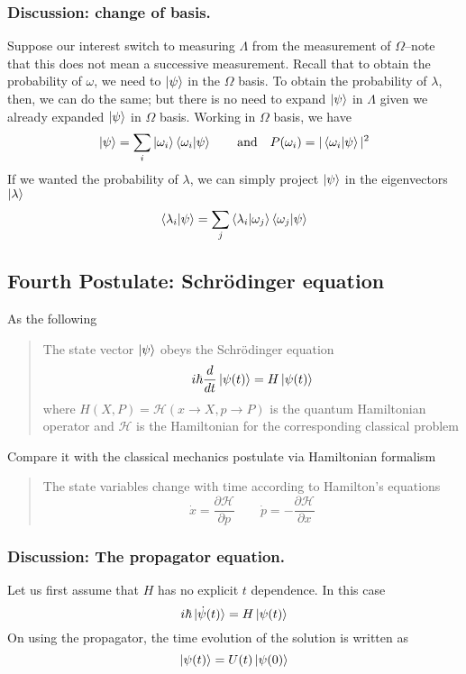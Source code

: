 \documentclass[../../../main.tex]{subfiles}
\begin{document}
\subsubsection{Discussion: change of basis.}
Suppose our interest switch to measuring $\Lambda$ from the measurement of $\Omega$--note that this does not mean a successive measurement.
Recall that to obtain the probability of $\omega$, we need to $\ket{\psi}$ in the $\Omega$ basis.
To obtain the probability of $\lambda$, then, we can do the same; but there is no need to expand $\ket{\psi}$ in $\Lambda$ given we already expanded $\ket{\psi}$ in $\Omega$ basis.
Working in $\Omega$ basis, we have 
\begin{equation*}
    \ket{\psi }=\sum_i \ket{\omega_i } \braket{\omega_i |\psi}\qquad\text{and}\quad P(\omega_i)=|\braket{\omega_i|\psi}|^2
\end{equation*}
If we wanted the probability of $\lambda$, we can simply project $\ket{\psi}$ in the eigenvectors $\ket{\lambda}$
\begin{equation*}
    \braket{\lambda_i|\psi}=\sum_j \braket{\lambda_i|\omega_j}\braket{\omega_j|\psi}
\end{equation*}


\subsection{Fourth Postulate: Schrödinger equation}
As the following
\begin{quotation}
    The state vector $\ket{\psi}$ obeys the Schrödinger equation
    \begin{equation*}
        i\hbar \frac{d }{dt }\ket{\psi(t )}= H \ket{\psi(t)}
    \end{equation*}
    where $H(X,P)=\mathcal{H }(x\rightarrow X, p\rightarrow P  )$ is the quantum Hamiltonian operator and $\mathcal{H }$ is the Hamiltonian for the corresponding classical problem
\end{quotation}
Compare it with the classical mechanics postulate via Hamiltonian formalism
\begin{quotation}
The state variables change with time according to Hamilton's equations
\begin{equation*}
    \dot{x}=\frac{\partial \mathcal{H }}{\partial p}\qquad \dot{p }=-\frac{\partial \mathcal{H }}{\partial x}
\end{equation*}
\end{quotation}

\subsubsection{Discussion: The propagator equation.}
Let us first assume that $H$ has no explicit $t$ dependence. In this case
\begin{equation*}
    i \hbar \ket{\dot{\psi}(t)}=H \ket{\psi(t)}
\end{equation*}
On using the propagator, the time evolution of the solution is written as 
\begin{equation*}
    \ket{\psi(t)}=U(t)\ket{\psi(0)}
\end{equation*}
\end{document}
